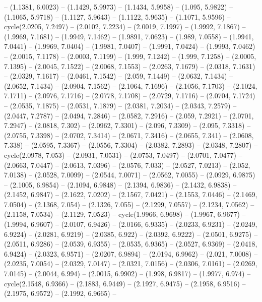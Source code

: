{  -- (1.1381, 6.0023) -- (1.1429, 5.9973) -- (1.1434, 5.9958) -- (1.095, 5.9822)
   -- (1.1065, 5.9718) -- (1.1127, 5.9643) -- (1.1122, 5.9635) -- (1.1071, 
  5.9596) -- cycle(2.0205, 7.2497) -- (2.0102, 7.2234) -- (2.0019, 7.1997) -- 
  (1.9992, 7.1867) -- (1.9969, 7.1681) -- (1.9949, 7.1462) -- (1.9891, 7.0623) 
  -- (1.989, 7.0558) -- (1.9941, 7.0441) -- (1.9969, 7.0404) -- (1.9981, 7.0407)
   -- (1.9991, 7.0424) -- (1.9993, 7.0462) -- (2.0015, 7.1178) -- (2.0003, 
  7.1199) -- (1.999, 7.1242) -- (1.999, 7.1258) -- (2.0005, 7.1395) -- (2.0045, 
  7.1522) -- (2.0068, 7.1553) -- (2.0263, 7.1679) -- (2.0318, 7.1631) -- 
  (2.0329, 7.1617) -- (2.0461, 7.1542) -- (2.059, 7.1449) -- (2.0632, 7.1434) --
   (2.0652, 7.1434) -- (2.0904, 7.1562) -- (2.1064, 7.1696) -- (2.1056, 7.1703) 
  -- (2.1024, 7.1711) -- (2.0976, 7.1716) -- (2.0778, 7.1708) -- (2.0729, 
  7.1716) -- (2.0704, 7.1724) -- (2.0535, 7.1875) -- (2.0531, 7.1879) -- 
  (2.0381, 7.2034) -- (2.0343, 7.2579) -- (2.0447, 7.2787) -- (2.0494, 7.2846) 
  -- (2.0582, 7.2916) -- (2.059, 7.2921) -- (2.0701, 7.2947) -- (2.0818, 7.302) 
  -- (2.0962, 7.3301) -- (2.096, 7.3309) -- (2.095, 7.3318) -- (2.0755, 7.3398) 
  -- (2.0702, 7.3414) -- (2.0671, 7.3416) -- (2.0655, 7.341) -- (2.0608, 7.338) 
  -- (2.0595, 7.3367) -- (2.0556, 7.3304) -- (2.0382, 7.2893) -- (2.0348, 
  7.2807) -- cycle(2.0978, 7.053) -- (2.0931, 7.0531) -- (2.0753, 7.0497) -- 
  (2.0701, 7.0477) -- (2.0663, 7.0447) -- (2.0613, 7.0396) -- (2.0576, 7.033) --
   (2.0527, 7.0213) -- (2.052, 7.0138) -- (2.0528, 7.0099) -- (2.0544, 7.0071) 
  -- (2.0562, 7.0055) -- (2.0929, 6.9875) -- (2.1005, 6.9854) -- (2.1094, 
  6.9848) -- (2.1394, 6.9836) -- (2.1432, 6.9838) -- (2.1452, 6.9847) -- 
  (2.1622, 7.0202) -- (2.1567, 7.0421) -- (2.1553, 7.0446) -- (2.1469, 7.0504) 
  -- (2.1368, 7.054) -- (2.1326, 7.055) -- (2.1299, 7.0557) -- (2.1234, 7.0562) 
  -- (2.1158, 7.0534) -- (2.1129, 7.0523) -- cycle(1.9966, 6.9698) -- (1.9967, 
  6.9677) -- (1.9994, 6.9607) -- (2.0107, 6.9426) -- (2.0166, 6.9335) -- 
  (2.0233, 6.9231) -- (2.0249, 6.9224) -- (2.0281, 6.9219) -- (2.0385, 6.922) --
   (2.0392, 6.9222) -- (2.0501, 6.9275) -- (2.0511, 6.9286) -- (2.0539, 6.9355) 
  -- (2.0535, 6.9365) -- (2.0527, 6.9369) -- (2.0418, 6.9424) -- (2.0323, 
  6.9571) -- (2.0207, 6.9894) -- (2.0194, 6.9962) -- (2.021, 7.0008) -- (2.0235,
   7.0054) -- (2.0329, 7.0147) -- (2.0321, 7.0156) -- (2.0306, 7.0161) -- 
  (2.0269, 7.0145) -- (2.0044, 6.994) -- (2.0015, 6.9902) -- (1.998, 6.9817) -- 
  (1.9977, 6.974) -- cycle(2.1548, 6.9366) -- (2.1883, 6.9449) -- (2.1927, 
  6.9475) -- (2.1958, 6.9516) -- (2.1975, 6.9572) -- (2.1992, 6.9665) -- 
}
